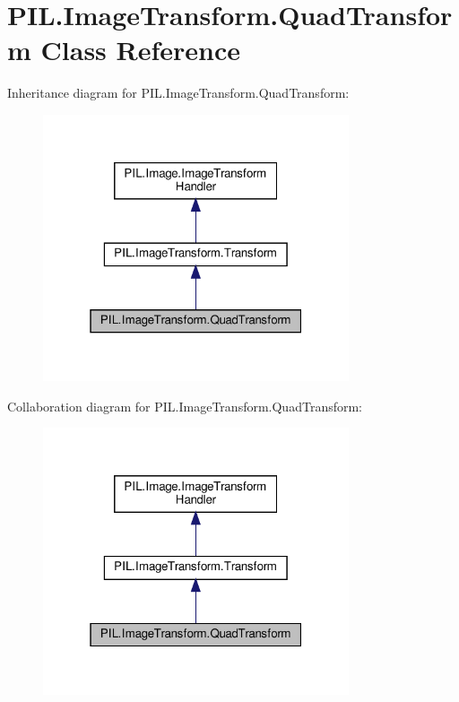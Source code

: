 \hypertarget{classPIL_1_1ImageTransform_1_1QuadTransform}{}\section{P\+I\+L.\+Image\+Transform.\+Quad\+Transform Class Reference}
\label{classPIL_1_1ImageTransform_1_1QuadTransform}


Inheritance diagram for P\+I\+L.\+Image\+Transform.\+Quad\+Transform\+:
\nopagebreak
\begin{figure}[H]
\begin{center}
\leavevmode
\includegraphics[width=256pt]{classPIL_1_1ImageTransform_1_1QuadTransform__inherit__graph}
\end{center}
\end{figure}


Collaboration diagram for P\+I\+L.\+Image\+Transform.\+Quad\+Transform\+:
\nopagebreak
\begin{figure}[H]
\begin{center}
\leavevmode
\includegraphics[width=256pt]{classPIL_1_1ImageTransform_1_1QuadTransform__coll__graph}
\end{center}
\end{figure}
